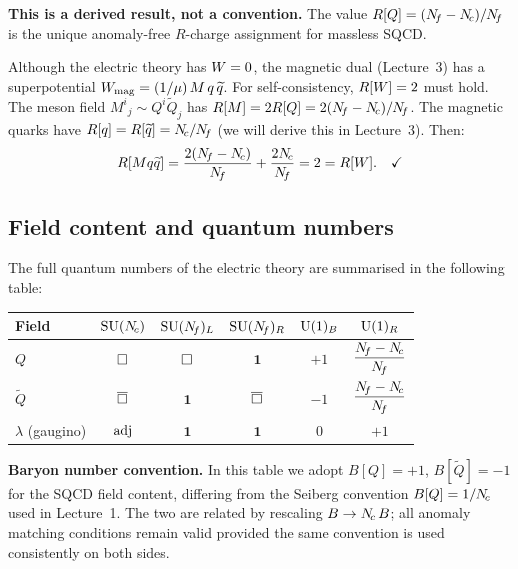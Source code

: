 \documentclass[11pt,a4paper]{article}
\begin{document}
\textbf{This is a derived result, not a convention.}  The value
$R[Q] = (N_{\!f} - N_{\!c})/N_{\!f}$ is the unique anomaly-free $R$-charge
assignment for massless SQCD.

\begin{remark}[Verification: $\Rcharge{\Wsup} = 2$]
\label{rem:R-check}
Although the electric theory has $W = 0$, the magnetic dual (Lecture~3)
has a superpotential
$W_{\text{mag}} = (1/\mu)\, M\, q\, \widetilde{q}$.  For self-consistency,
$\Rcharge{\Wsup} = 2$ must hold.  The meson field $M^i{}_j \sim Q^i
\widetilde{Q}_j$ has $R[M] = 2R[Q] = 2(N_{\!f} - N_{\!c})/N_{\!f}$.
The magnetic quarks have $R[q] = R[\widetilde{q}] = N_{\!c}/N_{\!f}$
(we will derive this in Lecture~3).  Then:
\begin{equation}
  R[M q\widetilde{q}]
  = \frac{2(N_{\!f} - N_{\!c})}{N_{\!f}} + \frac{2N_{\!c}}{N_{\!f}} = 2 = R[W].
  \quad\checkmark
  \label{eq:R-check}
\end{equation}
\end{remark}


\subsection{Field content and quantum numbers}
\label{sec:field-content-table}

The full quantum numbers of the electric theory are summarised in the
following table:

\begin{center}
\renewcommand{\arraystretch}{1.3}
\begin{tabular}{@{}l c c c c c@{}}
\toprule
\textbf{Field} & $\mathrm{SU}(N_{\!c})$ & $\mathrm{SU}(N_{\!f})_L$ & $\mathrm{SU}(N_{\!f})_R$ & $\mathrm{U}(1)_B$ & $\mathrm{U}(1)_R$ \\
\midrule
$Q$ & $\square$ & $\square$ & $\mathbf{1}$ & $+1$ & $\dfrac{N_{\!f} - N_{\!c}}{N_{\!f}}$ \\[8pt]
$\widetilde{Q}$ & $\overline{\square}$ & $\mathbf{1}$ & $\overline{\square}$ & $-1$
  & $\dfrac{N_{\!f} - N_{\!c}}{N_{\!f}}$ \\[8pt]
$\lambda$ (gaugino) & $\mathrm{adj}$ & $\mathbf{1}$ & $\mathbf{1}$ & $0$ & $+1$ \\
\bottomrule
\end{tabular}
\end{center}

\noindent\textbf{Baryon number convention.}\; In this table we adopt
$B[Q] = +1$, $B[\widetilde{Q}] = -1$ for the SQCD field content,
differing from the Seiberg convention $B[Q] = 1/N_{\!c}$ used in Lecture~1.
The two are related by rescaling $B \to N_{\!c}\, B$; all anomaly matching
conditions remain valid provided the same convention is used
consistently on both sides.
\end{document}
